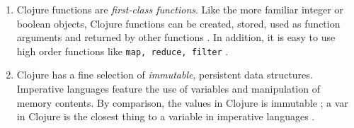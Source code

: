 \documentclass[12pt]{article}
\begin{document}
\begin{enumerate}

\item Clojure functions are {\it first-class functions}. Like the more familiar integer or boolean objects, Clojure functions can be created, stored, used as function arguments and returned by other functions \cite{fogus2014joy}. In addition, it is easy to use high order functions like \texttt{map, reduce, filter} \cite{rathore2011clojure}.



\item Clojure has a fine selection of {\it immutable}, persistent data structures. Imperative languages feature the use of variables and manipulation of memory contents. By comparison, the values in Clojure is immutable \cite{fogus2014joy}; a var in Clojure is the closest thing to a variable in imperative languages \cite{fogus2014joy}.
        





\end{enumerate}
\end{document}
